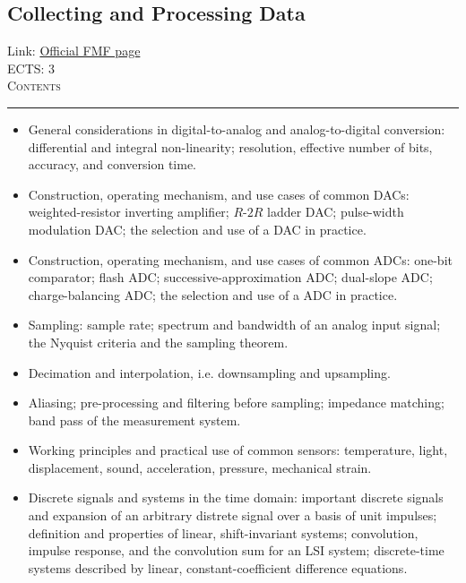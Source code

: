 \documentclass[11pt, a4paper]{article}
\newenvironment{course}[3]{
\subsection{#1}%
Link: \href{#2}{Official FMF page}\\%
ECTS: #3%
\vspace{1ex}
\\
{\large \textsc{Contents}}\\[-0.9ex]%
\rule{\textwidth}{0.5pt}
\vspace{-3ex}
}
{}
\newenvironment{chapter}[1]{
\begin{tcolorbox}[title=#1, breakable]
}
{\end{tcolorbox}}
\begin{document}
\begin{course}{Collecting and Processing Data}{https://www.fmf.uni-lj.si/en/study-physics/programmes/1fiz/2020/7000777/courses/1178/}{3}
\begin{chapter}{Analog-digital conversion}
\begin{itemize}
            \item General considerations in digital-to-analog and analog-to-digital conversion: differential and integral non-linearity; resolution, effective number of bits, accuracy, and conversion time.

            \item Construction, operating mechanism, and use cases of common DACs: weighted-resistor inverting amplifier; $ R $-$ 2R $ ladder DAC; pulse-width modulation DAC; the selection and use of a DAC in practice.

            \item Construction, operating mechanism, and use cases of common ADCs: one-bit comparator; flash ADC; successive-approximation ADC; dual-slope ADC; charge-balancing ADC; the selection and use of a ADC in practice.

        \end{itemize}
    \end{chapter}

    \begin{chapter}{Data acquisition}
        \begin{itemize}

            \item Sampling: sample rate; spectrum and bandwidth of an analog input signal; the Nyquist criteria and the sampling theorem.

            \item Decimation and interpolation, i.e. downsampling and upsampling.

            \item Aliasing; pre-processing and filtering before sampling; impedance matching; band pass of the measurement system.

            \item Working principles and practical use of common sensors: temperature, light, displacement, sound, acceleration, pressure, mechanical strain.
            
        \end{itemize}
    \end{chapter}

    \begin{chapter}{Digital signal processing}
        \begin{itemize}

            \item Discrete signals and systems in the time domain: important discrete signals and expansion of an arbitrary distrete signal over a basis of unit impulses; definition and properties of linear, shift-invariant systems; convolution, impulse response, and the convolution sum for an LSI system; discrete-time systems described by linear, constant-coefficient difference equations.


\end{itemize}
\end{chapter}
\end{course}
\end{document}
